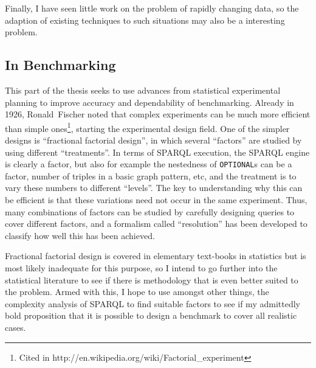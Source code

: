 \documentclass{llncs}
\begin{document}
Finally, I have seen little work on the problem of rapidly changing
data, so the adaption of existing techniques to such situations may
also be a interesting problem.


\subsection{In Benchmarking}\label{sec:benchmethod}

This part of the thesis seeks to use advances from statistical
experimental planning to improve accuracy and dependability of
benchmarking. Already in 1926, Ronald~Fischer noted that complex
experiments can be much more efficient than simple ones\footnote{Cited
  in http://en.wikipedia.org/wiki/Factorial\_experiment}, starting the
experimental design field. One of the simpler designs is ``fractional
factorial design'', in which several ``factors'' are studied by using
different ``treatments''. In terms of SPARQL execution, the SPARQL
engine is clearly a factor, but also for example the nestedness of
\texttt{OPTIONAL}s can be a factor, number of triples in a basic graph
pattern, etc, and the treatment is to vary these numbers to different
``levels''. The key to understanding why this can be efficient is that
these variations need not occur in the same experiment. Thus, many
combinations of factors can be studied by carefully designing queries
to cover different factors, and a formalism called ``resolution'' has
been developed to classify how well this has been achieved.

Fractional factorial design is covered in elementary text-books in
statistics but is most likely inadequate for this purpose, so I intend
to go further into the statistical literature to see if there is
methodology that is even better suited to the problem. Armed with
this, I hope to use amongst other things, the complexity analysis of
SPARQL to find suitable factors to see if my admittedly bold
proposition that it is possible to design a benchmark to cover all
realistic cases.


%

%

\end{document}
